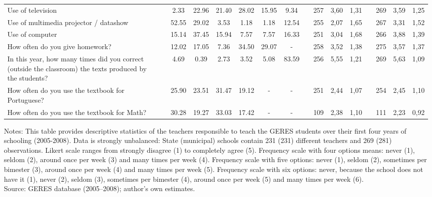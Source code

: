 \documentclass[a4paper, 12pt]{article}
\begin{document}
\begin{landscape}
\begin{table}[htbp]
\begin{adjustbox}{width=10.5in,totalheight=6in}
\begin{tabular}{llcccccccccccccc}
    Use of television &       & 2.33  & 22.96 & 21.40 & 28.02 & 15.95 & 9.34  &       & 257   & 3,60  & 1,31  &       & 269   & 3,59  & 1,25 \\
    Use of multimedia projector / datashow &       & 52.55 & 29.02 & 3.53  & 1.18  & 1.18  & 12.54 &       & 255   & 2,07  & 1,65  &       & 267   & 3,31  & 1,52 \\
    Use of computer &       & 15.14 & 37.45 & 15.94 & 7.57  & 7.57  & 16.33 &       & 251   & 3,04  & 1,68  &       & 266   & 3,88  & 1,39 \\
    How often do you give homework? &       & 12.02 & 17.05 & 7.36  & 34.50 & 29.07 & -     &       & 258   & 3,52  & 1,38  &       & 275   & 3,57  & 1,37 \\
    In this year, how many times did you correct (outside the classroom) the texts produced by the students? &       & 4.69  & 0.39  & 2.73  & 3.52  & 5.08  & 83.59 &       & 256   & 5,55  & 1,21  &       & 269   & 5,63  & 1,09 \\
    How often do you use the textbook for Portuguese? &       & 25.90 & 23.51 & 31.47 & 19.12 & -     & -     &       & 251   & 2,44  & 1,07  &       & 254   & 2,45  & 1,10 \\
    How often do you use the textbook for Math? &       & 30.28 & 19.27 & 33.03 & 17.42 & -     & -     &       & 109   & 2,38  & 1,10  &       & 111   & 2,23  & 0,92 \\
    \bottomrule 
    \end{tabular}%
    \end{adjustbox}
    \begin{minipage}{1.65\textheight}            \scriptsize Notes: This table provides descriptive statistics of the teachers responsible to teach the GERES students over their first four years of schooling (2005-2008). Data is strongly unbalanced: State (municipal) schools contain 231 (231) different teachers and 269 (281) observations. Likert scale ranges from strongly disagree (1) to completely agree (5). Frequency scale with four options means: never (1), seldom (2), around once per week (3) and many times per week (4). Frequency scale with five options: never (1), seldom (2), sometimes per bimester (3), around once per week (4) and many times per week (5). Frequency scale with six options: never, because the school does not have it (1), never (2), seldom (3), sometimes per bimester (4), around once per week (5) and many times per week (6). \\                     
Source: GERES database (2005–2008); author’s own estimates.             
\end{minipage}   
\end{table}%
\end{landscape}%
\restoregeometry%
\end{document}
